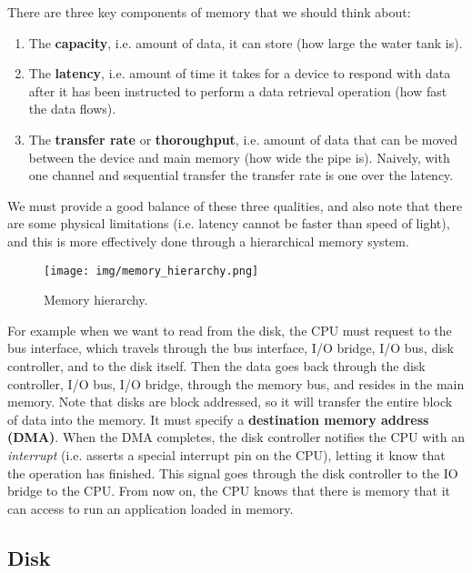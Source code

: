   There are three key components of memory that we should think about: 
  \begin{enumerate}
    \item The \textbf{capacity}, i.e. amount of data, it can store (how large the water tank is). 
    \item The \textbf{latency}, i.e. amount of time it takes for a device to respond with data after it has been instructed to perform a data retrieval operation (how fast the data flows). 
    \item The \textbf{transfer rate} or \textbf{thoroughput}, i.e. amount of data that can be moved between the device and main memory (how wide the pipe is). Naively, with one channel and sequential transfer the transfer rate is one over the latency. 
  \end{enumerate}

  We must provide a good balance of these three qualities, and also note that there are some physical limitations (i.e. latency cannot be faster than speed of light), and this is more effectively done through a hierarchical memory system.

  \begin{figure}[H]
    \centering 
    \texttt{[image: img/memory\_hierarchy.png]}
    \caption{Memory hierarchy.} 
    \label{fig:memory_hierarchy}
  \end{figure}

  For example when we want to read from the disk, the CPU must request to the bus interface, which travels through the bus interface, I/O bridge, I/O bus, disk controller, and to the disk itself. Then the data goes back through the disk controller, I/O bus, I/O bridge, through the memory bus, and resides in the main memory. Note that disks are block addressed, so it will transfer the entire block of data into the memory. It must specify a \textbf{destination memory address (DMA)}. When the DMA completes, the disk controller notifies the CPU with an \textit{interrupt} (i.e. asserts a special interrupt pin on the CPU), letting it know that the operation has finished. This signal goes through the disk controller to the IO bridge to the CPU. From now on, the CPU knows that there is memory that it can access to run an application loaded in memory. 

\subsection{Disk} 

